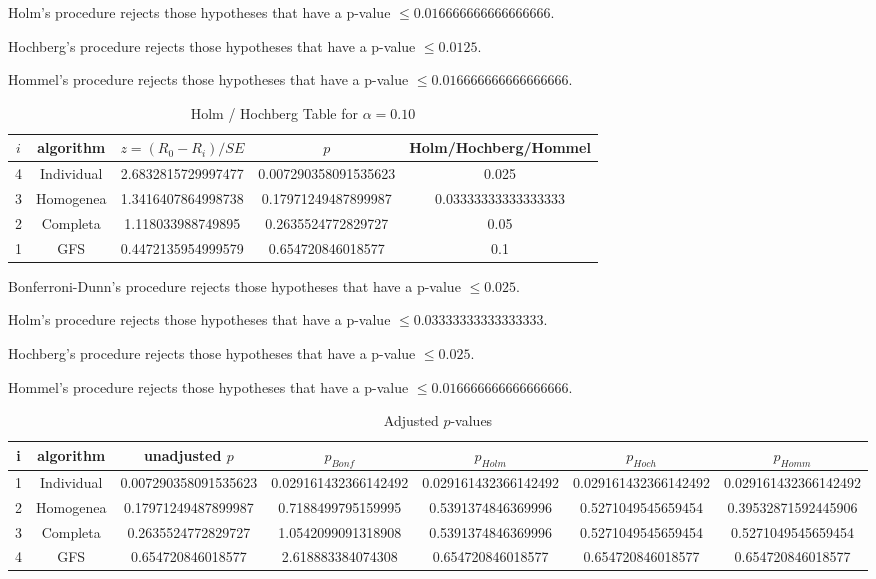 \documentclass[a4paper,10pt]{article}
\begin{document}
\begin{landscape}
Holm's procedure rejects those hypotheses that have a p-value $\le0.016666666666666666$.


Hochberg's procedure rejects those hypotheses that have a p-value $\le0.0125$.


Hommel's procedure rejects those hypotheses that have a p-value $\le0.016666666666666666$.


\begin{table}[!htp]
\centering\tiny
\caption{Holm / Hochberg Table for $\alpha=0.10$}
\begin{tabular}{ccccc}
$i$&algorithm&$z=(R_0 - R_i)/SE$&$p$&Holm/Hochberg/Hommel\\
\hline
4&Individual&2.6832815729997477&0.007290358091535623&0.025\\
3&Homogenea&1.3416407864998738&0.17971249487899987&0.03333333333333333\\
2&Completa&1.118033988749895&0.2635524772829727&0.05\\
1&GFS&0.4472135954999579&0.654720846018577&0.1\\
\hline
\end{tabular}
\end{table}
Bonferroni-Dunn's procedure rejects those hypotheses that have a p-value $\le0.025$.


Holm's procedure rejects those hypotheses that have a p-value $\le0.03333333333333333$.


Hochberg's procedure rejects those hypotheses that have a p-value $\le0.025$.


Hommel's procedure rejects those hypotheses that have a p-value $\le0.016666666666666666$.


\begin{table}[!htp]
\centering\tiny
\caption{Adjusted $p$-values}
\begin{tabular}{ccccccc}
i&algorithm&unadjusted $p$&$p_{Bonf}$&$p_{Holm}$&$p_{Hoch}$&$p_{Homm}$\\
\hline
1&Individual&0.007290358091535623&0.029161432366142492&0.029161432366142492&0.029161432366142492&0.029161432366142492\\
2&Homogenea&0.17971249487899987&0.7188499795159995&0.5391374846369996&0.5271049545659454&0.39532871592445906\\
3&Completa&0.2635524772829727&1.0542099091318908&0.5391374846369996&0.5271049545659454&0.5271049545659454\\
4&GFS&0.654720846018577&2.618883384074308&0.654720846018577&0.654720846018577&0.654720846018577\\
\hline
\end{tabular}
\end{table}


\end{landscape}
\end{document}
